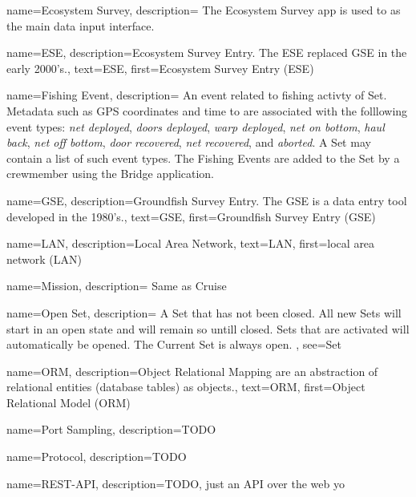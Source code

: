  {
  name=Ecosystem Survey,
  description={
    The Ecosystem Survey app is used to as the main data input interface.
    }
}

 {
  name=ESE,
  description={Ecosystem Survey Entry. The ESE replaced \gls{GSE} in the early 2000's.},
  text={ESE},
  first={Ecosystem Survey Entry (ESE)}
}

 {
  name=Fishing Event,
  description={
    An event related to fishing activty of \gls{Set}.
    Metadata such as GPS coordinates and time to are associated with the folllowing event types:
    \emph{net deployed},
    \emph{doors deployed},
    \emph{warp deployed},
    \emph{net on bottom},
    \emph{haul back},
    \emph{net off bottom},
    \emph{door recovered},
    \emph{net recovered},
    and \emph{aborted}.
    A \gls{Set} may contain a list of such event types.
    The Fishing Events are added to the \gls{Set} by a crewmember using the \gls{Bridge} application.
  }
}

 {
  name=GSE,
  description={Groundfish Survey Entry. The GSE is a data entry tool developed in the 1980's.},
  text={GSE},
  first={Groundfish Survey Entry (GSE)}
}

 {
  name=LAN,
  description={Local Area Network},
  text={LAN},
  first={local area network (LAN)}
}

 {
  name=Mission,
  description={
    Same as \gls{Cruise}
  }
}

 {
  name=Open Set,
  description={
    A \gls{Set} that has not been closed. All new Sets will start in an open state and will remain so untill closed. 
    Sets that are activated will automatically be opened. 
    The \gls{Current Set} is always open.
  },
  see={Set}
}

 {
  name=ORM,
  description={Object Relational Mapping are an abstraction of relational entities (database tables) as objects.},
  text={ORM},
  first={Object Relational Model (ORM)}
}

 {
  name=Port Sampling,
  description={TODO}
}

 {
  name=Protocol,
  description={TODO}
}

 {
  name=REST-API,
  description={TODO, just an API over the web yo}
}

